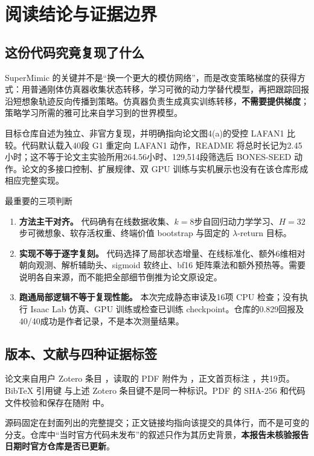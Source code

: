 \section{阅读结论与证据边界}
\subsection{这份代码究竟复现了什么}
SuperMimic 的关键并不是“换一个更大的模仿网络”，而是改变策略梯度的获得方式：用普通刚体仿真器收集状态转移，学习可微的动力学替代模型，再把跟踪回报沿短想象轨迹反向传播到策略。仿真器负责生成真实训练转移，\textbf{不需要提供梯度}；策略学习所需的雅可比来自学习到的世界模型\cite{liao_supermimic_2026}。

目标仓库自述为独立、非官方复现，并明确指向论文图4(a)的受控 LAFAN1 比较\cite{zhang_supermimic_vibed}。代码默认载入40段 G1 重定向 LAFAN1 动作，README 将总时长记为2.45小时；这不等于论文主实验所用264.56小时、129,514段筛选后 BONES-SEED 动作。论文的多接口控制、扩展规律、双 GPU 训练与实机展示也没有在该仓库形成相应完整实现。

\begin{insight}{最重要的三项判断}
\begin{enumerate}
\item \textbf{方法主干对齐。} 代码确有在线数据收集、$k=8$步自回归动力学学习、$H=32$步可微想象、软存活权重、终端价值 bootstrap 与固定的 $\lambda$-return 目标。
\item \textbf{实现不等于逐字复刻。} 代码选择了局部状态增量、在线标准化、额外6维相对朝向观测、解析辅助头、sigmoid 软终止、bf16 矩阵乘法和额外预热等。需要说明各自来源，而不能把全部细节倒推为论文原设定。
\item \textbf{跑通局部逻辑不等于复现性能。} 本次完成静态审读及16项 CPU 检查；没有执行 Isaac Lab 仿真、GPU 训练或检查已训练 checkpoint。仓库的0.829回报及40/40成功是作者记录，不是本次测量结果。
\end{enumerate}
\end{insight}

\subsection{版本、文献与四种证据标签}
论文来自用户 Zotero 条目 ，读取的 PDF 附件为 ，正文首页标注 ，共19页。BibTeX 引用键  与上述 Zotero 条目键不是同一种标识。PDF 的 SHA-256 和代码文件校验和保存在随附  中。

源码固定在封面列出的完整提交；正文链接均指向该提交的具体行，而不是可变的  分支。仓库中“当时官方代码未发布”的叙述只作为其历史背景，\textbf{本报告未核验报告日期时官方仓库是否已更新}。


